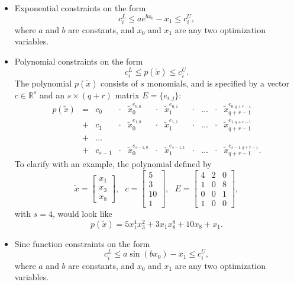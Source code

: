 \begin{itemize}
\item
Exponential constraints on the form
\begin{equation}
\label{eqn:exponential}
c_i^L \leq ae^{bx_0} - x_1 \leq c_i^U,
\end{equation}
where $a$ and $b$ are constants, and $x_0$ and $x_1$ are any two optimization variables.
\item
Polynomial constraints on the form
\begin{equation}
\label{eqn:polynomial}
c_i^L \leq p(\tilde{x}) \leq c_i^U.
\end{equation}
The polynomial $p(\tilde{x})$ consists of $s$ monomials, and is specified by a vector $c \in \mathbb{R}^s$ and an $s \times (q+r)$ matrix $E = \lbrace e_{i,j} \rbrace$:
\begin{equation}
\begin{array}{ccccccccccc}
p(\tilde{x}) &=& c_0 & \cdot & \tilde{x}_0^{e_{0,0}} & \cdot & \tilde{x}_1^{e_{0,1}} & \cdot & \dots & \cdot & \tilde{x}_{q+r-1}^{e_{0,q+r-1}} \\ 
&+& c_1 & \cdot & \tilde{x}_0^{e_{1,0}} & \cdot & \tilde{x}_1^{e_{1,1}} & \cdot & \dots & \cdot &  \tilde{x}_{q+r-1}^{e_{1,q+r-1}} \\
&+& \dots  \\
&+& c_{s-1} & \cdot & \tilde{x}_0^{e_{s-1,0}} & \cdot & \tilde{x}_1^{e_{s-1,1}} & \cdot & \dots & \cdot  & \tilde{x}_{q+r-1}^{e_{s-1,q+r-1}}.
\end{array}
\label{eqn:polyconstr}
\end{equation}
To clarify with an example, the polynomial defined by
\[
\tilde{x} = \begin{bmatrix} x_1 \\ x_3 \\ x_8 \end{bmatrix},\ \ \ c = \begin{bmatrix} 5 \\ 3 \\ 10 \\ 1 \end{bmatrix},\ \ \ E = \begin{bmatrix} 4 & 2 & 0  \\ 1 & 0 & 8 \\ 0 & 0 & 1 \\ 1 & 0 & 0 \end{bmatrix},
\]
with $s = 4$, would look like
\[
p(\tilde{x}) = 5 x_1^4 x_3^2 + 3 x_1 x_8^8 + 10 x_8 + x_1.
\]
\item
Sine function constraints on the form
\begin{equation}
\label{eqn:sine}
c_i^L \leq a \sin (bx_0) - x_1 \leq c_i^U,
\end{equation}
where $a$ and $b$ are constants, and $x_0$ and $x_1$ are any two optimization variables.
\end{itemize}


